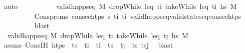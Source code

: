 \begin{isabellebody}
\ auto\isanewline
\ \ \ \ \ \ \isamarkupfalse%
\ \isamarkupfalse%
\ {}{\isacharcolon}{\kern0pt}\ {\isachardoublequoteopen}valid{\isacharunderscore}{\kern0pt}happ{\isacharunderscore}{\kern0pt}seq\ M\ {\isacharparenleft}{\kern0pt}dropWhile\ {\isacharparenleft}{\kern0pt}leq\ t\isactrlsub i{\isacharparenright}{\kern0pt}\ {\isacharparenleft}{\kern0pt}takeWhile\ {\isacharparenleft}{\kern0pt}leq\ t\isactrlsub i{\isacharprime}{\kern0pt}{\isacharparenright}{\kern0pt}\ hs{\isacharparenright}{\kern0pt}{\isacharparenright}{\kern0pt}\ M{\isacharprime}{\kern0pt}{\isacharprime}{\kern0pt}{\isachardoublequoteclose}\isanewline
\ \ \ \ \ \ \ \ \isamarkupfalse%
\ Cons{\isachardot}{\kern0pt}prems\ {\isacartoucheopen}consec{\isacharunderscore}{\kern0pt}htps\ {\isasympi}s\ t\isactrlsub i\ t\isactrlsub i{\isacharprime}{\kern0pt}{\isacartoucheclose}\ valid{\isacharunderscore}{\kern0pt}happ{\isacharunderscore}{\kern0pt}seq{\isacharunderscore}{\kern0pt}valid{\isacharunderscore}{\kern0pt}state{\isacharunderscore}{\kern0pt}seq{\isacharunderscore}{\kern0pt}consec{\isacharunderscore}{\kern0pt}htps\isanewline
\ \ \ \ \ \ \ \ \isamarkupfalse%
\ blast\isanewline
\ \ \ \ \ \ \isamarkupfalse%
\ {}{\isacharcolon}{\kern0pt}\ {\isachardoublequoteopen}valid{\isacharunderscore}{\kern0pt}happ{\isacharunderscore}{\kern0pt}seq\ M{\isacharprime}{\kern0pt}{\isacharprime}{\kern0pt}\ {\isacharparenleft}{\kern0pt}dropWhile\ {\isacharparenleft}{\kern0pt}leq\ t\isactrlsub i{\isacharprime}{\kern0pt}{\isacharparenright}{\kern0pt}\ {\isacharparenleft}{\kern0pt}takeWhile\ {\isacharparenleft}{\kern0pt}leq\ t\isactrlsub j{\isacharparenright}{\kern0pt}\ hs{\isacharparenright}{\kern0pt}{\isacharparenright}{\kern0pt}\ M{\isacharprime}{\kern0pt}{\isachardoublequoteclose}\isanewline
\ \ \ \ \ \ \ \ \isamarkupfalse%
\ assms\ Cons{\isachardot}{\kern0pt}IH\ {\isacartoucheopen}htps\ {\isacharequal}{\kern0pt}\ {\isacharparenleft}{\kern0pt}ts\ {\isacharat}{\kern0pt}\ {\isacharbrackleft}{\kern0pt}t\isactrlsub i{\isacharbrackright}{\kern0pt}{\isacharparenright}{\kern0pt}\ {\isacharat}{\kern0pt}\ t\isactrlsub i{\isacharprime}{\kern0pt}\ {\isacharhash}{\kern0pt}\ ts\ {\isacharat}{\kern0pt}\ t\isactrlsub j\ {\isacharhash}{\kern0pt}\ ts\ tsj\ \isamarkupfalse%
\ blast\isanewline
\ \ \ \ \ \ \isamarkupfalse%
\ \isamarkupfalse%

\end{isabellebody}
